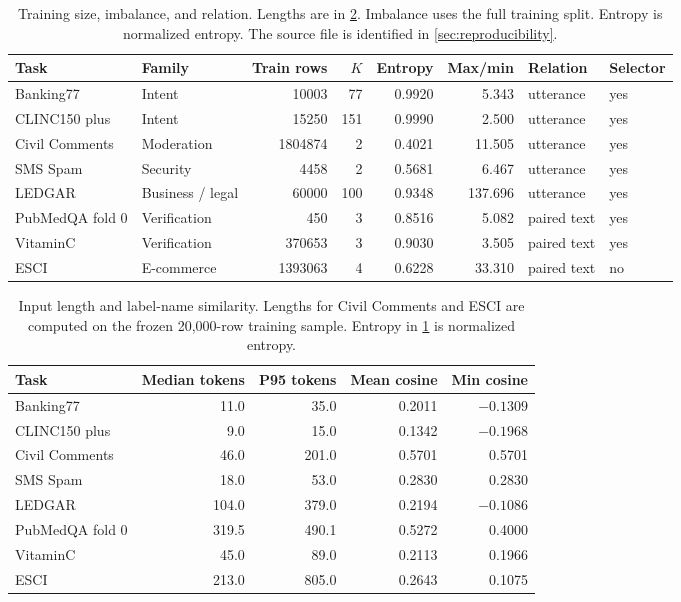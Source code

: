\begin{table}[htbp]
\centering
\small
\setlength{\tabcolsep}{4pt}
\renewcommand{\thetable}{1a}
\caption{Training size, imbalance, and relation. Lengths are in \cref{tab:fingerprint-b}. Imbalance uses the full training split. Entropy is normalized entropy. The source file is identified in \cref{sec:reproducibility}.}
\label{tab:fingerprint-a}
\begin{tabular}{@{}llrrrrll@{}}
\toprule
Task & Family & Train rows & \(K\) & Entropy & Max/min & Relation & Selector \\
\midrule
Banking77 & Intent & 10003 & 77 & 0.9920 & 5.343 & utterance & yes \\
CLINC150 plus & Intent & 15250 & 151 & 0.9990 & 2.500 & utterance & yes \\
Civil Comments & Moderation & 1804874 & 2 & 0.4021 & 11.505 & utterance & yes \\
SMS Spam & Security & 4458 & 2 & 0.5681 & 6.467 & utterance & yes \\
LEDGAR & Business / legal & 60000 & 100 & 0.9348 & 137.696 & utterance & yes \\
PubMedQA fold 0 & Verification & 450 & 3 & 0.8516 & 5.082 & paired text & yes \\
VitaminC & Verification & 370653 & 3 & 0.9030 & 3.505 & paired text & yes \\
ESCI & E-commerce & 1393063 & 4 & 0.6228 & 33.310 & paired text & no \\
\bottomrule
\end{tabular}
\end{table}

\begin{table}[htbp]
\centering
\small
\setlength{\tabcolsep}{6pt}
\renewcommand{\thetable}{1b}
\caption{Input length and label-name similarity. Lengths for Civil Comments and ESCI are computed on the frozen 20{,}000-row training sample. Entropy in \cref{tab:fingerprint-a} is normalized entropy.}
\label{tab:fingerprint-b}
\begin{tabular}{@{}lrrrr@{}}
\toprule
Task & Median tokens & P95 tokens & Mean cosine & Min cosine \\
\midrule
Banking77 & 11.0 & 35.0 & 0.2011 & $-0.1309$ \\
CLINC150 plus & 9.0 & 15.0 & 0.1342 & $-0.1968$ \\
Civil Comments & 46.0 & 201.0 & 0.5701 & 0.5701 \\
SMS Spam & 18.0 & 53.0 & 0.2830 & 0.2830 \\
LEDGAR & 104.0 & 379.0 & 0.2194 & $-0.1086$ \\
PubMedQA fold 0 & 319.5 & 490.1 & 0.5272 & 0.4000 \\
VitaminC & 45.0 & 89.0 & 0.2113 & 0.1966 \\
ESCI & 213.0 & 805.0 & 0.2643 & 0.1075 \\
\bottomrule
\end{tabular}
\end{table}
\setcounter{table}{1}
\renewcommand{\thetable}{\arabic{table}}
